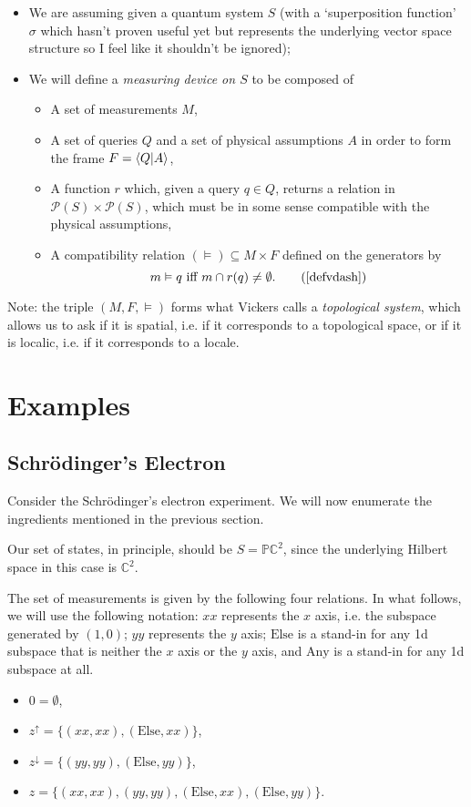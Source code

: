 \documentclass{article}
\theoremstyle{definition}
\theoremstyle{plain}
\newcommand{\C}{\mathbb{C}}
\newcommand{\ps}{\mathcal{P}}
\newcommand{\pr}{\mathbb{P}}
\begin{document}
\begin{itemize}
\item We are assuming given a quantum system $S$ (with a `superposition function' $\sigma$ which hasn't proven useful yet but represents the underlying vector space structure so I feel like it shouldn't be ignored);

\item We will define a \emph{measuring device on $S$} to be composed of
\begin{itemize}
\item A set of measurements $M$,
\item A set of queries $Q$ and a set of physical assumptions $A$ in order to form the frame $F = \braket{Q|A}$,
\item A function $r$ which, given a query $q \in Q$, returns a relation in $\ps(S) \times \ps(S)$, which must be in some sense compatible with the physical assumptions,
\item A compatibility relation $(\vDash) \subseteq M \times F$ defined on the generators by
\begin{equation}
m \vDash q \text{ iff } m \cap r(q) \neq \emptyset. \tag{\ref{defvdash}}
\end{equation}
\end{itemize}
\end{itemize}

Note: the triple $(M,F,\vDash)$ forms what Vickers \cite{topologyvialogic} calls a \emph{topological system}, which allows us to ask if it is spatial, i.e. if it corresponds to a topological space, or if it is localic, i.e. if it corresponds to a locale.

\section{Examples}

\subsection{Schrödinger's Electron}

Consider the Schrödinger's electron experiment. We will now enumerate the ingredients mentioned in the previous section.

Our set of states, in principle, should be $S = \pr \C^2$, since the underlying Hilbert space in this case is $\C^2$.

The set of measurements is given by the following four relations. In what follows, we will use the following notation: $xx$ represents the $x$ axis, i.e. the subspace generated by $(1,0)$; $yy$ represents the $y$ axis; $\text{Else}$ is a stand-in for any 1d subspace that is neither the $x$ axis or the $y$ axis, and $\text{Any}$ is a stand-in for any 1d subspace at all.
\begin{itemize}
\item $0 = \emptyset$,
\item $z^\uparrow = \{(xx,xx), (\text{Else}, xx)\}$,
\item $z^\downarrow = \{(yy,yy), (\text{Else},yy)\}$,
\item $z = \{(xx,xx), (yy, yy), (\text{Else}, xx), (\text{Else}, yy)\}$.
\end{itemize}
\end{document}
